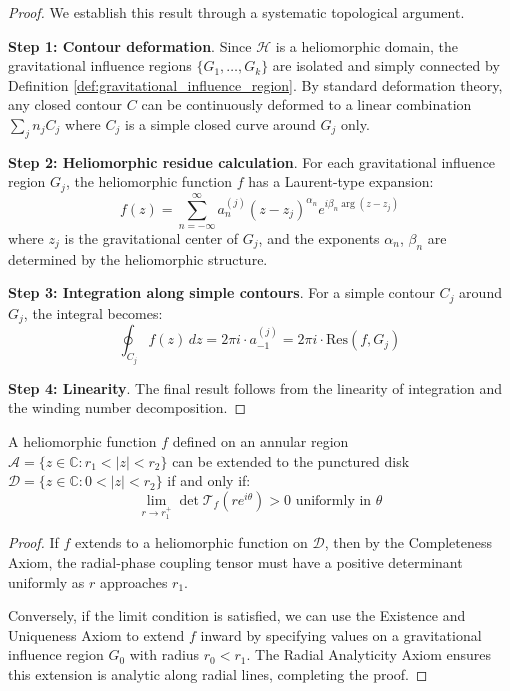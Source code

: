 \begin{proof}
We establish this result through a systematic topological argument.

\textbf{Step 1: Contour deformation}. Since $\mathcal{H}$ is a heliomorphic domain, the gravitational influence regions $\{G_1, \ldots, G_k\}$ are isolated and simply connected by Definition \ref{def:gravitational_influence_region}. By standard deformation theory, any closed contour $C$ can be continuously deformed to a linear combination $\sum_j n_j C_j$ where $C_j$ is a simple closed curve around $G_j$ only.

\textbf{Step 2: Heliomorphic residue calculation}. For each gravitational influence region $G_j$, the heliomorphic function $f$ has a Laurent-type expansion:
\begin{equation}
f(z) = \sum_{n=-\infty}^{\infty} a_n^{(j)} (z - z_j)^{\alpha_n} e^{i\beta_n \arg(z - z_j)}
\end{equation}
where $z_j$ is the gravitational center of $G_j$, and the exponents $\alpha_n$, $\beta_n$ are determined by the heliomorphic structure.

\textbf{Step 3: Integration along simple contours}. For a simple contour $C_j$ around $G_j$, the integral becomes:
\begin{equation}
\oint_{C_j} f(z) \, dz = 2\pi i \cdot a_{-1}^{(j)} = 2\pi i \cdot \text{Res}(f, G_j)
\end{equation}

\textbf{Step 4: Linearity}. The final result follows from the linearity of integration and the winding number decomposition.
\end{proof}

\begin{theorem}
A heliomorphic function $f$ defined on an annular region $\mathcal{A} = \{z \in \mathbb{C} : r_1 < |z| < r_2\}$ can be extended to the punctured disk $\mathcal{D} = \{z \in \mathbb{C} : 0 < |z| < r_2\}$ if and only if:
\begin{equation}
\lim_{r \to r_1^+} \det\mathcal{T}_f(re^{i\theta}) > 0 \text{ uniformly in } \theta
\end{equation}
\end{theorem}

\begin{proof}
If $f$ extends to a heliomorphic function on $\mathcal{D}$, then by the Completeness Axiom, the radial-phase coupling tensor must have a positive determinant uniformly as $r$ approaches $r_1$.

Conversely, if the limit condition is satisfied, we can use the Existence and Uniqueness Axiom to extend $f$ inward by specifying values on a gravitational influence region $G_0$ with radius $r_0 < r_1$. The Radial Analyticity Axiom ensures this extension is analytic along radial lines, completing the proof.
\end{proof}

